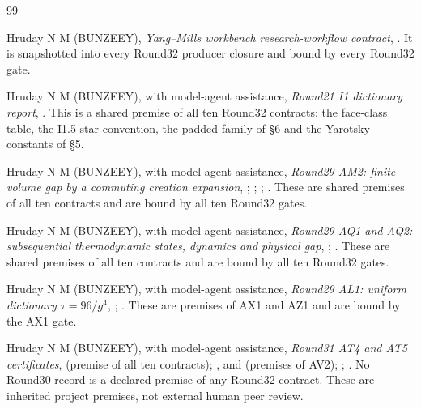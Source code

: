 \begin{thebibliography}{99}
\small

Hruday N M (BUNZEEY),
\emph{Yang--Mills workbench research-workflow contract},
.
It is snapshotted into every Round32 producer closure and bound by every
Round32 gate.

Hruday N M (BUNZEEY), with model-agent assistance,
\emph{Round21 I1 dictionary report},
.
This is a shared premise of all ten Round32 contracts: the face-class table,
the I1.5 star convention, the padded family of \S6 and the Yarotsky constants
of \S5.

Hruday N M (BUNZEEY), with model-agent assistance,
\emph{Round29 AM2: finite-volume gap by a commuting creation expansion},
;
;
;
.
These are shared premises of all ten contracts and are bound by all ten
Round32 gates.

Hruday N M (BUNZEEY), with model-agent assistance,
\emph{Round29 AQ1 and AQ2: subsequential thermodynamic states, dynamics and
physical gap},
;
.
These are shared premises of all ten contracts and are bound by all ten
Round32 gates.

Hruday N M (BUNZEEY), with model-agent assistance,
\emph{Round29 AL1: uniform dictionary $\tau=96/g^4$},
;
.
These are premises of AX1 and AZ1 and are bound by the AX1 gate.

Hruday N M (BUNZEEY), with model-agent assistance,
\emph{Round31 AT4 and AT5 certificates},
 (premise of
all ten contracts);
,
 and
 (premises
of AV2);
;
.
No Round30 record is a declared premise of any Round32 contract.
These are inherited project premises, not external human peer review.


\end{thebibliography}
